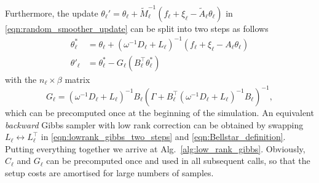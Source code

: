 \documentclass[11pt,english]{article}
\theoremstyle{plain}
\theoremstyle{plain}
\theoremstyle{plain}
\theoremstyle{plain}
\numberwithin{equation}{section}
\begin{document}
Furthermore, the update $\theta_\ell' =\theta_\ell + \widetilde{M}_\ell^{-1}(f_\ell+\xi_\ell-\widetilde{A}_\ell\theta_\ell)$ in \eqref{eqn:random_smoother_update} can be split into two steps as follows
\begin{equation}
    \begin{aligned}
        \theta_\ell^* & = \theta_\ell + (\omega^{-1}D_\ell+L_\ell)^{-1} (f_\ell+\xi_\ell-A_\ell \theta_\ell) \\
        \theta'_\ell  & = \theta_\ell^* - G_{\ell} (B_{\ell}^{\top} \theta_\ell^*)
    \end{aligned}\label{eqn:lowrank_gibbs_two_steps}
\end{equation}
with the $n_\ell\times\beta$ matrix
\begin{equation}
    G_{\ell} =  (\omega^{-1}D_\ell+L_\ell)^{-1}B_{\ell}\left(\Gamma + B_{\ell}^{\top} \left(\omega^{-1}D_\ell+L_\ell\right)^{-1}B_{\ell}\right)^{-1},
    \label{eqn:Bellstar_definition}
\end{equation}
which can be precomputed once at the beginning of the simulation. An equivalent \textit{backward} Gibbs sampler with low rank correction can be obtained by swapping $L_\ell\leftrightarrow L_\ell^\top$ in \eqref{eqn:lowrank_gibbs_two_steps} and \eqref{eqn:Bellstar_definition}.
Putting everything together we arrive at Alg.~\ref{alg:low_rank_gibbs}. Obviously, $C_\ell$ and $G_{\ell}$ can be precomputed once and used in all subsequent calls, so that the setup costs are amortised for large numbers of samples.
\begin{algorithm}[t!]
    \caption{Gibbs smoother with low rank correction for Bayesian inference.\\Computes the update $\theta_\ell\mapsto\theta'_\ell$ based on the matrix splitting $\widetilde{A}_\ell=\widetilde{M}_\ell-\widetilde{N}_\ell$ in \eqref{eqn:M_lowrank_gibbs}}\label{alg:low_rank_gibbs}
    \begin{algorithmic}[1]
        \Else
        \EndIf
        \State{}
        \EndProcedure
    \end{algorithmic}
\end{algorithm}
\end{document}
